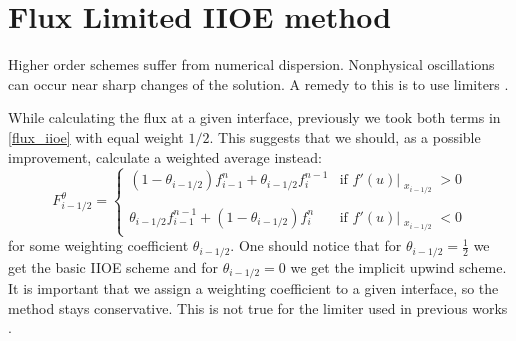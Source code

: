 \documentclass[../include.tex]{subfiles}
\begin{document}
\section{Flux Limited IIOE method}
Higher order schemes suffer from numerical dispersion. Nonphysical oscillations can occur near sharp changes of the solution. A remedy to this is to use limiters \cite{lev}.

While calculating the flux at a given interface, previously we took both terms in \eqref{flux_iioe} with equal weight $ 1/2 $. This suggests that we should, as a possible improvement, calculate a weighted average instead:
\begin{equation}
	\label{limited_flux}
	F_{i - 1/2}^{\theta} = 
\begin{cases}
	(1-\theta_{i-1/2})f^n_{i-1} + \theta_{i-1/2} f^{n-1}_{i} &  \text{if } f'(u)\big|_{\substack{x_{i-1/2}}} > 0\\
	\\
	\theta_{i-1/2} f^{n-1}_{i-1} + (1-\theta_{i-1/2}) f^{n}_{i} &  \text{if } f'(u)\big|_{\substack{x_{i-1/2}}} < 0
\end{cases}
\end{equation}
for some weighting coefficient $ \theta_{i-1/2} $. One should notice that for $ \theta_{i-1/2} = \frac{1}{2} $ we get the basic IIOE scheme and for $ \theta_{i-1/2} = 0 $ we get the implicit upwind scheme.\\
It is important that we assign a weighting coefficient to a given interface, so the method stays conservative. This is not true for the limiter used in previous works \cite{iioe2012, iioe2}.
\end{document}
